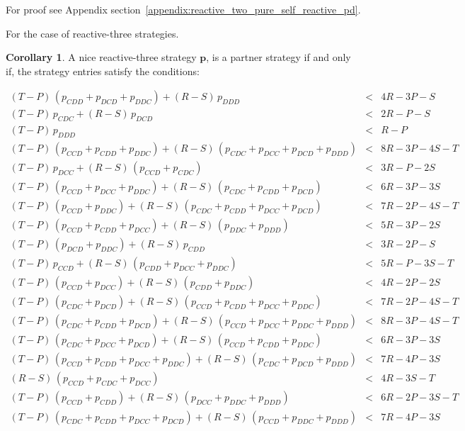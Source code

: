 \documentclass{article}
\theoremstyle{definition}
\newtheorem{corollary}{Corollary}[theorem]
\begin{document}
For proof see Appendix section~\ref{appendix:reactive_two_pure_self_reactive_pd}.

For the case of reactive-three strategies.

\begin{corollary}\label{corollary:reactive_three_partner_strategies_PD}
A nice reactive-three strategy $\mathbf{p}$, is a partner strategy if and only if,
the strategy entries satisfy the conditions:

\begin{equation*}
  \begin{array}{ccc}
    (T - P)\, (p_{CDD} + p_{DCD} + p_{DDC}) + (R - S)\, p_{DDD}  & < & 4 R - 3 P  - S \\ [0.2cm]
    (T - P)\, p_{CDC}  + (R - S)\, p_{DCD}  & < & 2 R - P  - S \\ [0.2cm]
    (T - P)\, p_{DDD} & < & R - P\\ [0.2cm]
    (T - P)\,(p_{CCD} + p_{CDD} + p_{DDC}) + (R - S)\,(p_{CDC} + p_{DCC} + p_{DCD} + p_{DDD}) & < & 8 R - 3 P - 4 S - T \\ [0.2cm]
    (T - P)\, p_{DCC}  + (R - S)\,(p_{CCD} + p_{CDC}) & < & 3 R - P - 2 S \\ [0.2cm]
    (T - P)\,(p_{CCD} + p_{DCC} + p_{DDC}) + (R - S)\,(p_{CDC} + p_{CDD} + p_{DCD}) & < & 6 R - 3 P - 3 S \\ [0.2cm]
    (T - P)\,(p_{CCD} + p_{DDC}) + (R - S)\,(p_{CDC} + p_{CDD} + p_{DCC} + p_{DCD}) & < & 7 R - 2 P - 4 S - T \\ [0.2cm]
    (T - P)\,(p_{CCD} + p_{CDD} + p_{DCC}) + (R - S)\,(p_{DDC} + p_{DDD}) & < & 5 R - 3 P - 2 S \\ [0.2cm]
    (T - P)\,(p_{DCD} + p_{DDC}) + (R - S)\, p_{CDD}  & < & 3 R - 2 P - S \\ [0.2cm] 
    (T - P)\, p_{CCD} + (R - S)\,(p_{CDD} + p_{DCC} + p_{DDC}) & < & 5 R - P - 3 S - T \\ [0.2cm]
    (T - P)\,(p_{CCD} + p_{DCC}) + (R - S)\,(p_{CDD} + p_{DDC}) & < & 4 R - 2 P - 2 S \\ [0.2cm]
    (T - P)\,(p_{CDC} + p_{DCD}) + (R - S)\,(p_{CCD} + p_{CDD} + p_{DCC} + p_{DDC}) & < & 7 R - 2 P - 4 S - T \\ [0.2cm]
    (T - P)\,(p_{CDC} + p_{CDD} + p_{DCD}) + (R - S)\,(p_{CCD} + p_{DCC} + p_{DDC} + p_{DDD}) & < & 8 R - 3 P - 4 S - T \\ [0.2cm]
    (T - P)\,(p_{CDC} + p_{DCC} + p_{DCD}) + (R - S)\,(p_{CCD} + p_{CDD} + p_{DDC}) & < & 6 R - 3 P - 3 S \\ [0.2cm]
    (T - P)\,(p_{CCD} + p_{CDD} + p_{DCC} + p_{DDC}) + (R - S)\,(p_{CDC} + p_{DCD} + p_{DDD}) & < & 7 R - 4 P - 3 S \\ [0.2cm]
    (R - S)\,(p_{CCD} + p_{CDC} + p_{DCC}) & < & 4 R - 3 S - T \\ [0.2cm]
    (T - P)\,(p_{CCD} + p_{CDD}) + (R - S)\,(p_{DCC} + p_{DDC} + p_{DDD}) & < & 6 R - 2 P - 3 S - T \\ [0.2cm]
    (T - P)\,(p_{CDC} + p_{CDD} + p_{DCC} + p_{DCD}) + (R - S)\,(p_{CCD} + p_{DDC} + p_{DDD}) & < & 7 R - 4 P - 3 S \\ [0.2cm]
    \end{array}
\end{equation*}
\end{corollary}
\end{document}
